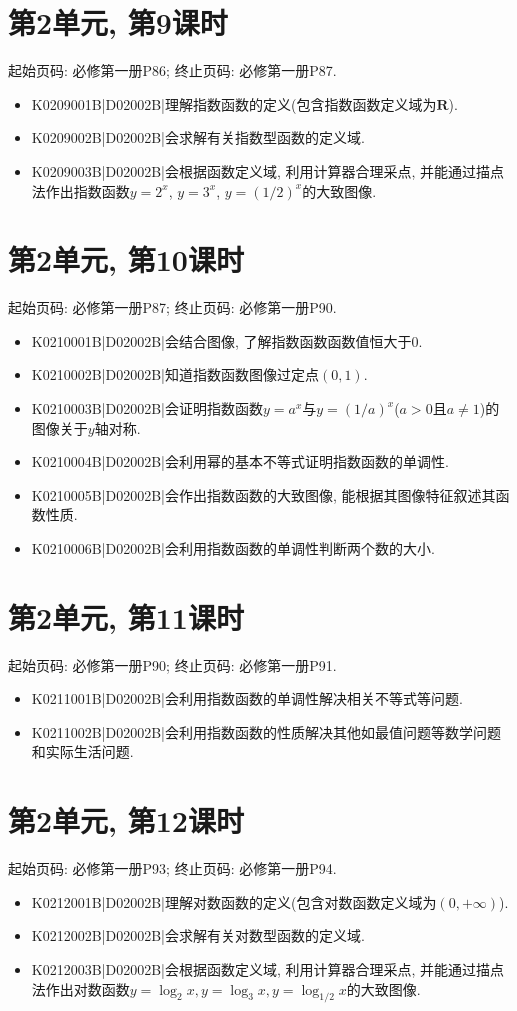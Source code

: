 \section*{第2单元, 第9课时}
起始页码: 必修第一册P86; 终止页码: 必修第一册P87.
\begin{itemize}
\item K0209001B|D02002B|理解指数函数的定义(包含指数函数定义域为$\mathbf{R}$).
\item K0209002B|D02002B|会求解有关指数型函数的定义域.
\item K0209003B|D02002B|会根据函数定义域, 利用计算器合理采点, 并能通过描点法作出指数函数$y=2^{x}$, $y=3^{x}$, $y=(1/2)^{x}$的大致图像.
\end{itemize}

\section*{第2单元, 第10课时}
起始页码: 必修第一册P87; 终止页码: 必修第一册P90.
\begin{itemize}
\item K0210001B|D02002B|会结合图像, 了解指数函数函数值恒大于$0$.
\item K0210002B|D02002B|知道指数函数图像过定点$(0,1)$.
\item K0210003B|D02002B|会证明指数函数$y=a^{x}$与$y=(1/a)^{x}$($a>0$且$a\neq1$)的图像关于$y$轴对称.
\item K0210004B|D02002B|会利用幂的基本不等式证明指数函数的单调性.
\item K0210005B|D02002B|会作出指数函数的大致图像, 能根据其图像特征叙述其函数性质.
\item K0210006B|D02002B|会利用指数函数的单调性判断两个数的大小.
\end{itemize}

\section*{第2单元, 第11课时}
起始页码: 必修第一册P90; 终止页码: 必修第一册P91.
\begin{itemize}
\item K0211001B|D02002B|会利用指数函数的单调性解决相关不等式等问题.
\item K0211002B|D02002B|会利用指数函数的性质解决其他如最值问题等数学问题和实际生活问题.
\end{itemize}

\section*{第2单元, 第12课时}
起始页码: 必修第一册P93; 终止页码: 必修第一册P94.
\begin{itemize}
\item K0212001B|D02002B|理解对数函数的定义(包含对数函数定义域为$(0,+\infty)$).
\item K0212002B|D02002B|会求解有关对数型函数的定义域.
\item K0212003B|D02002B|会根据函数定义域, 利用计算器合理采点, 并能通过描点法作出对数函数$y=\log_2x,y=\log_3x,y=\log_{1/2}x$的大致图像.
\end{itemize}

